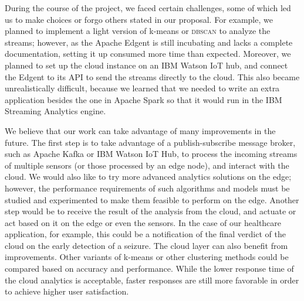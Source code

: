 \documentclass[letterpaper]{article}
\begin{document}
During the course of the project, we faced certain challenges, some of which led us to make choices or forgo others stated in our proposal. For example, we planned to implement a light version of k-means or \textsc{dbscan} to analyze the streams; however, as the Apache Edgent is still incubating and lacks a complete documentation, setting it up consumed more time than expected. Moreover, we planned to set up the cloud instance on an IBM Watson IoT hub, and connect the Edgent to its API to send the streams directly to the cloud. This also became unrealistically difficult, because we learned that we needed to write an extra application besides the one in Apache Spark so that it would run in the IBM Streaming Analytics engine.

We believe that our work can take advantage of many improvements in the future. The first step is to take advantage of a publish-subscribe message broker, such as Apache Kafka or IBM Watson IoT Hub, to process the incoming streams of multiple sensors (or those processed by an edge node), and interact with the cloud. We would also like to try more advanced analytics solutions on the edge; however, the performance requirements of such algorithms and models must be studied and experimented to make them feasible to perform on the edge. Another step would be to receive the result of the analysis from the cloud, and actuate or act based on it on the edge or even the sensors. In the case of our healthcare application, for example, this could be a notification of the final verdict of the cloud on the early detection of a seizure. The cloud layer can also benefit from improvements. Other variants of k-means or other clustering methods could be compared based on accuracy and performance. While the lower response time of the cloud analytics is acceptable, faster responses are still more favorable in order to achieve higher user satisfaction.


{\footnotesize }
\end{document}
